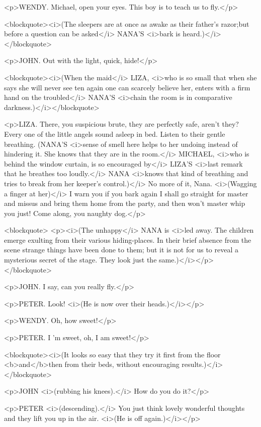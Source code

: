 <p>WENDY. Michael, open your eyes. This boy is to teach us to
fly.</p>

<blockquote><i>(The sleepers are at once as awake as their father's
razor;but before a question can be asked</i> NANA'S <i>bark is
heard.)</i></blockquote>

<p>JOHN. Out with the light, quick, hide!</p>

<blockquote><i>(When the maid</i> LIZA, <i>who is so small that when
she says she will never see ten again one can scarcely believe her,
enters with a firm hand on the troubled</i> NANA'S <i>chain the room
is in comparative darkness.)</i></blockquote>

<p>LIZA. There, you suspicious brute, they are perfectly safe, aren't
they? Every one of the little angels sound asleep in bed. Listen to
their gentle breathing. (NANA'S <i>sense of smell here helps to her
undoing instead of hindering it. She knows that they are in the
room.</i> MICHAEL, <i>who is behind the window curtain, is so
encouraged by</i> LIZA'S <i>last remark that he breathes too
loudly.</i> NANA <i>knows that kind of breathing and tries to break
from her keeper's control.)</i> No more of it, Nana. <i>(Wagging a
finger at her)</i> I warn you if you bark again I shall go straight
for master and missus and bring them home from the party, and then
won't master whip you just! Come along, you naughty dog.</p>

<blockquote>
<p><i>(The unhappy</i> NANA is <i>led away. The children emerge
exulting from their various hiding-places. In their brief absence
from the scene strange things have been done to them; but it is not
for us to reveal a mysterious secret of the stage. They look just the
same.)</i></p>
</blockquote>

<p>JOHN. I say, can you really fly.</p>

<p>PETER. Look! <i>(He is now over their heads.)</i></p>

<p>WENDY. Oh, how sweet!</p>

<p>PETER. I 'm sweet, oh, I am sweet!</p>

<blockquote><i>(It looks so easy that they try it first from the
floor <b>and</b>then from their beds, without encouraging
results.)</i></blockquote>

<p>JOHN <i>(rubbing his knees).</i> How do you do it?</p>

<p>PETER <i>(descending).</i> You just think lovely wonderful
thoughts and they lift you up in the air. <i>(He is off
again.)</i></p>

